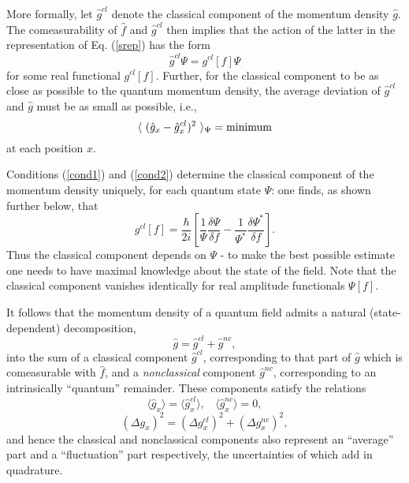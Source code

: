 \documentclass[a4paper,preprint, showpacs, aps, draft]{revtex4}
\begin{document}
{More formally, let $\hat{g}^{cl}$ denote the classical component of the
momentum density $\hat{g}$.  The comeasurability of $\hat{f}$ and
$\hat{g}^{cl}$ then implies that the action of the latter in the
representation of Eq. (\ref{srep}) has the form
\begin{equation} \label{cond1}
\hat{g}^{cl} \Psi = g^{cl}[f]\Psi
\end{equation}
for some real functional $g^{cl}[f]$.   
Further, for the classical component to be as close as possible
to the quantum momentum density, the average
deviation of $\hat{g}^{cl}$ and $\hat{g}$ must be as small as possible,
i.e., 
\begin{equation} \label{cond2}
\langle ~(\hat{g}_x - \hat{g}^{cl}_x)^2~ \rangle_\Psi = {\rm
minimum}
\end{equation}
at each position $x$.

Conditions (\ref{cond1}) and (\ref{cond2}) determine the classical
component of the momentum density uniquely, for each quantum state
$\Psi$: one finds, as shown further below, that  
\begin{equation} \label{gcl}
g^{cl}[f] = \frac{\hbar}{2i} \left[\frac{1}{\Psi}\frac{\delta\Psi}{\delta f} 
- \frac{1}{\Psi^*}\frac{\delta\Psi^*}{\delta f} \right]. 
\end{equation}
Thus the classical component depends on
$\Psi$ - to make the best possible estimate one needs to have 
maximal knowledge about the state of the field. Note that the
classical component vanishes identically for real amplitude functionals
$\Psi[f]$.

It follows that the momentum density of a quantum field admits a natural
(state-dependent) decomposition,
\begin{equation}
\label{gdecomp} \hat{g} = \hat{g}^{cl} + \hat{g}^{nc} ,
\end{equation}
into the sum of a classical component $\hat{g}^{cl}$,
corresponding to
that part of $\hat{g}$ which is comeasurable with $\hat{f}$, and a {\it
nonclassical} component $\hat{g}^{nc}$, corresponding to an 
intrinsically ``quantum'' remainder. These
components satisfy the relations
\begin{equation} \label{gav}
\langle \hat{g}_x\rangle = \langle\hat{g}^{cl}_x\rangle,
~~~~\langle\hat{g}^{nc}_x\rangle = 0,
\end{equation} 
\begin{equation} \label{gvar}
(\Delta g_x)^2 = (\Delta g^{cl}_x)^2 + (\Delta g^{nc}_x)^2 , 
\end{equation}
and hence the classical and nonclassical components also represent an
``average'' part and a ``fluctuation'' part respectively, the 
uncertainties of which add in quadrature. 

}
\end{document}
